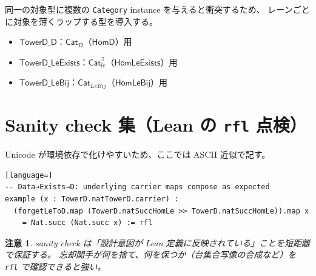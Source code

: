 \documentclass[a4paper,12pt]{ltjsarticle}
\newtheorem{remark}{注意}[section]
\newcommand{\HomD}{\ensuremath{\mathsf{HomD}}}
\newcommand{\HomLeExists}{\ensuremath{\mathsf{HomLeExists}}}
\newcommand{\HomLeBij}{\ensuremath{\mathsf{HomLeBij}}}
\newcommand{\CatD}{\ensuremath{\mathsf{Cat}_D}}
\newcommand{\Catleexists}{\ensuremath{\mathsf{Cat}_{le}^{\exists}}}
\newcommand{\CatLeBij}{\ensuremath{\mathsf{Cat}_{LeBij}}}
\begin{document}
同一の対象型に複数の \texttt{Category} instance を与えると衝突するため、
レーンごとに対象を薄くラップする型を導入する。

\begin{itemize}
  \item \(\mathsf{TowerD\_D}\)：\CatD（\HomD）用
  \item \(\mathsf{TowerD\_LeExists}\)：\Catleexists（\HomLeExists）用
  \item \(\mathsf{TowerD\_LeBij}\)：\CatLeBij（\HomLeBij）用
\end{itemize}

\section{Sanity check 集（Lean の \texttt{rfl} 点検）}

Unicode が環境依存で化けやすいため、ここでは ASCII 近似で記す。

\begin{lstlisting}[language=]
-- Data→Exists→D: underlying carrier maps compose as expected
example (x : TowerD.natTowerD.carrier) :
  (forgetLeToD.map (TowerD.natSuccHomLe >> TowerD.natSuccHomLe)).map x
    = Nat.succ (Nat.succ x) := rfl
\end{lstlisting}

\begin{remark}
sanity check は「設計意図が Lean 定義に反映されている」ことを短距離で保証する。
忘却関手が何を捨て、何を保つか（台集合写像の合成など）を \texttt{rfl} で確認できると強い。
\end{remark}
\end{document}

